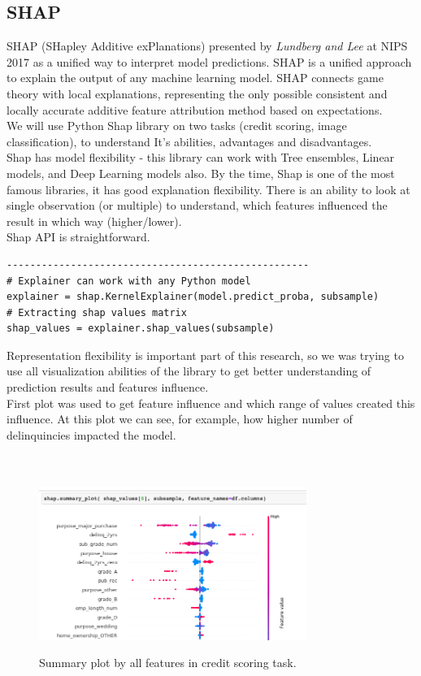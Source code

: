\subsection{SHAP}
SHAP (SHapley Additive exPlanations) presented by \textit{Lundberg and Lee} \cite{SHAP} at NIPS 2017 as a unified way to interpret model predictions. 
SHAP is a unified approach to explain the output of any machine learning model. SHAP connects game theory with local explanations, representing the only possible consistent and locally accurate additive feature attribution method based on expectations. \\
We will use Python Shap library on two tasks (credit scoring, image classification), to understand It's abilities, advantages and disadvantages.\\
Shap has model flexibility - this library can work with Tree ensembles, Linear models, and Deep Learning models also. By the time, Shap is one of the most famous libraries, it has good explanation flexibility. There is an ability to look at single observation (or multiple) to understand, which features influenced the result in which way (higher/lower). \\
Shap API is straightforward. \\
\begin{lstlisting}
----------------------------------------------------
# Explainer can work with any Python model
explainer = shap.KernelExplainer(model.predict_proba, subsample)
# Extracting shap values matrix
shap_values = explainer.shap_values(subsample)
\end{lstlisting}
Representation flexibility is important part of this research, so we was trying to use all visualization abilities of the library to get better understanding of prediction results and features influence.\\
First plot was used to get feature influence and which range of values created this influence. At this plot we can see, for example,  how higher number of delinquincies impacted the model.\\
\\
\\

\begin{figure}[!htb]
\centering
\includegraphics[height=5cm]{shap_ex1.png}\\[0.5cm] 
\caption{Summary plot by all features in credit scoring task. }
\end{figure}

